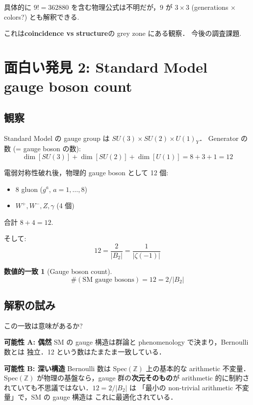 \documentclass[11pt,a4paper]{article}
\newtheorem{coincidence}{数値的一致}
\begin{document}
具体的に $9! = 362880$ を含む物理公式は不明だが，$9$ が $3 \times 3$
(generations × colors?) とも解釈できる.

これは\textbf{coincidence vs structure}の grey zone にある観察．
今後の調査課題.

\section{面白い発見 2: Standard Model gauge boson count}

\subsection{観察}

Standard Model の gauge group は $SU(3) \times SU(2) \times U(1)_Y$．
Generator の数 (= gauge boson の数):
\begin{equation}
\dim[SU(3)] + \dim[SU(2)] + \dim[U(1)] = 8 + 3 + 1 = 12
\end{equation}

電弱対称性破れ後，物理的 gauge boson として 12 個:
\begin{itemize}
\item 8 gluon ($g^a$, $a = 1, \ldots, 8$)
\item $W^+, W^-, Z, \gamma$ (4 個)
\end{itemize}
合計 $8 + 4 = 12$.

そして:
\begin{equation}
12 = \frac{2}{|B_2|} = \frac{1}{|\zeta(-1)|}
\end{equation}

\begin{coincidence}[Gauge boson count]
$$\#(\text{SM gauge bosons}) = 12 = 2/|B_2|$$
\end{coincidence}

\subsection{解釈の試み}

この一致は意味があるか?

\textbf{可能性 A: 偶然}
SM の gauge 構造は群論と phenomenology で決まり，Bernoulli 数とは
独立．12 という数はたまたま一致している．

\textbf{可能性 B: 深い構造}
Bernoulli 数は Spec$(\mathbb{Z})$ 上の基本的な arithmetic 不変量．
Spec$(\mathbb{Z})$ が物理の基盤なら，gauge 群の\textbf{次元そのもの}が
arithmetic 的に制約されていても不思議ではない．$12 = 2/|B_2|$ は
「最小の non-trivial arithmetic 不変量」で，SM の gauge 構造は
これに最適化されている．
\end{document}
